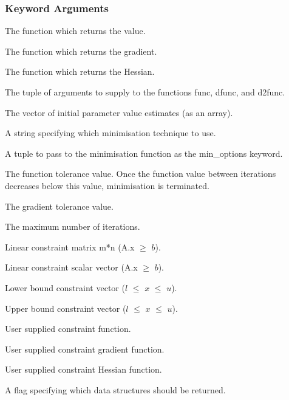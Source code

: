   
 \subsubsection{Keyword Arguments} 

   The function which returns the value.   

   The function which returns the gradient.   

   The function which returns the Hessian.   

   The tuple of arguments to supply to the functions func, dfunc, and d2func.   

   The vector of initial parameter value estimates (as an array).   

   A string specifying which minimisation technique to use.   

   A tuple to pass to the minimisation function as the min\_options keyword.   

   The function tolerance value.  Once the function value between iterations decreases below this value, minimisation is terminated.   

   The gradient tolerance value.   

   The maximum number of iterations.   

   Linear constraint matrix m*n (A.x $\ge$ $b$).   

   Linear constraint scalar vector (A.x $\ge$ $b$).   

   Lower bound constraint vector ($l$ $\le$ $x$ $\le$ $u$).   

   Upper bound constraint vector ($l$ $\le$ $x$ $\le$ $u$).   

   User supplied constraint function.   

   User supplied constraint gradient function.   

   User supplied constraint Hessian function.   

   A flag specifying which data structures should be returned.   

